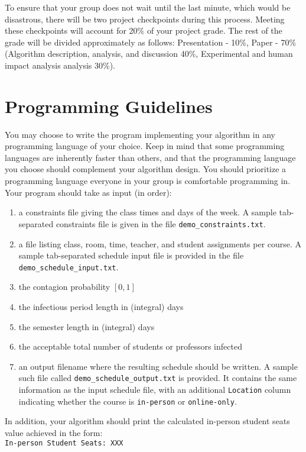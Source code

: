 \documentclass[12pt]{article}
\begin{document}
To ensure that your group does not wait until the last minute, which would be disastrous, there will be two project checkpoints during this process. Meeting these checkpoints will account for 20\% of your project grade. The rest of the grade will be divided approximately as follows: Presentation - 10\%, Paper - 70\% (Algorithm description, analysis, and discussion 40\%, Experimental and human impact analysis analysis 30\%).

\section{Programming Guidelines}
You may choose to write the program implementing your algorithm in any programming language of your choice. Keep in mind that some programming languages are inherently faster than others, and that the programming language you choose should complement your algorithm design. You should prioritize a programming language everyone in your group is comfortable programming in.  Your program should take as input (in order):
\begin{enumerate}
\item a constraints file giving the class times and days of the week.  A sample tab-separated constraints file is given in the file \texttt{demo\_constraints.txt}.
\item a file listing class, room, time, teacher, and student assignments per course. A sample tab-separated schedule input file is provided in the file \texttt{demo\_schedule\_input.txt}. 
\item the contagion probability $[0,1]$
\item the infectious period length in (integral) days
\item the semester length in (integral) days
\item the acceptable total number of students or professors infected
\item an output filename where the resulting schedule should be written.  A sample such file called \texttt{demo\_schedule\_output.txt} is provided.  It contains the same information as the input schedule file, with an additional \texttt{Location} column indicating whether the course is \texttt{in-person} or \texttt{online-only}.
\end{enumerate}

In addition, your algorithm should print the calculated in-person student seats value achieved in the form:\\
\texttt{In-person Student Seats: XXX}
\end{document}
